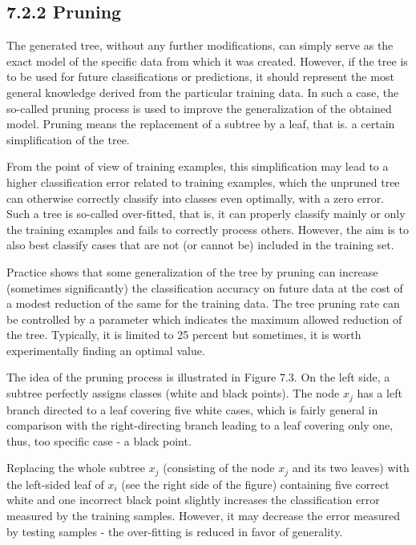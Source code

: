 \documentclass[10pt]{book}
\begin{document}
\subsection*{7.2.2 Pruning}
The generated tree, without any further modifications, can simply serve as the exact model of the specific data from which it was created. However, if the tree is to be used for future classifications or predictions, it should represent the most general knowledge derived from the particular training data. In such a case, the so-called pruning process is used to improve the generalization of the obtained model. Pruning means the replacement of a subtree by a leaf, that is. a certain simplification of the tree.

From the point of view of training examples, this simplification may lead to a higher classification error related to training examples, which the unpruned tree can otherwise correctly classify into classes even optimally, with a zero error. Such a tree is so-called over-fitted, that is, it can properly classify mainly or only\\
the training examples and fails to correctly process others. However, the aim is to also best classify cases that are not (or cannot be) included in the training set.

Practice shows that some generalization of the tree by pruning can increase (sometimes significantly) the classification accuracy on future data at the cost of a modest reduction of the same for the training data. The tree pruning rate can be controlled by a parameter which indicates the maximum allowed reduction of the tree. Typically, it is limited to 25 percent but sometimes, it is worth experimentally finding an optimal value.

The idea of the pruning process is illustrated in Figure 7.3. On the left side, a subtree perfectly assigns classes (white and black points). The node $x_{j}$ has a left branch directed to a leaf covering five white cases, which is fairly general in comparison with the right-directing branch leading to a leaf covering only one, thus, too specific case - a black point.

Replacing the whole subtree $x_{j}$ (consisting of the node $x_{j}$ and its two leaves) with the left-sided leaf of $x_{i}$ (see the right side of the figure) containing five correct white and one incorrect black point slightly increases the classification error measured by the training samples. However, it may decrease the error measured by testing samples - the over-fitting is reduced in favor of generality.
\end{document}
